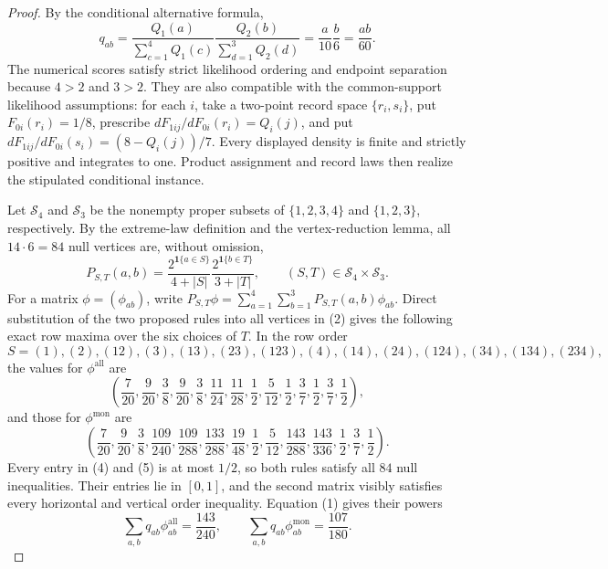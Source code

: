 \documentclass{article}
\begin{document}
\begin{proof}
By the conditional alternative formula,
\[
 q_{ab}=\frac{Q_1(a)}{\sum_{c=1}^4Q_1(c)}
 \frac{Q_2(b)}{\sum_{d=1}^3Q_2(d)}
 =\frac{a}{10}\frac{b}{6}=\frac{ab}{60}. \tag{1}
\]
The numerical scores satisfy strict likelihood ordering and endpoint separation because \(4>2\) and \(3>2\). They are also compatible with the common-support likelihood assumptions: for each \(i\), take a two-point record space \(\{r_i,s_i\}\), put \(F_{0i}(r_i)=1/8\), prescribe \(dF_{1ij}/dF_{0i}(r_i)=Q_i(j)\), and put \(dF_{1ij}/dF_{0i}(s_i)=(8-Q_i(j))/7\). Every displayed density is finite and strictly positive and integrates to one. Product assignment and record laws then realize the stipulated conditional instance.

Let \(\mathcal S_4\) and \(\mathcal S_3\) be the nonempty proper subsets of \(\{1,2,3,4\}\) and \(\{1,2,3\}\), respectively. By the extreme-law definition and the vertex-reduction lemma, all \(14\cdot6=84\) null vertices are, without omission,
\[
 P_{S,T}(a,b)=
 \frac{2^{\mathbf1\{a\in S\}}}{4+|S|}
 \frac{2^{\mathbf1\{b\in T\}}}{3+|T|},
 \qquad (S,T)\in\mathcal S_4\times\mathcal S_3. \tag{2}
\]
For a matrix \(\phi=(\phi_{ab})\), write \(P_{S,T}\phi=\sum_{a=1}^4\sum_{b=1}^3P_{S,T}(a,b)\phi_{ab}\). Direct substitution of the two proposed rules into all vertices in (2) gives the following exact row maxima over the six choices of \(T\). In the row order
\[
 S=(1),(2),(12),(3),(13),(23),(123),(4),(14),(24),(124),(34),(134),(234), \tag{3}
\]
the values for \(\phi^{\mathrm{all}}\) are
\[
 \left(\frac7{20},\frac9{20},\frac38,\frac9{20},\frac38,
 \frac{11}{24},\frac{11}{28},\frac12,\frac5{12},\frac12,
 \frac37,\frac12,\frac37,\frac12\right), \tag{4}
\]
and those for \(\phi^{\mathrm{mon}}\) are
\[
 \left(\frac7{20},\frac9{20},\frac38,\frac{109}{240},
 \frac{109}{288},\frac{133}{288},\frac{19}{48},\frac12,
 \frac5{12},\frac{143}{288},\frac{143}{336},\frac12,
 \frac37,\frac12\right). \tag{5}
\]
Every entry in (4) and (5) is at most \(1/2\), so both rules satisfy all \(84\) null inequalities. Their entries lie in \([0,1]\), and the second matrix visibly satisfies every horizontal and vertical order inequality. Equation (1) gives their powers
\[
 \sum_{a,b}q_{ab}\phi^{\mathrm{all}}_{ab}=\frac{143}{240},
 \qquad
 \sum_{a,b}q_{ab}\phi^{\mathrm{mon}}_{ab}=\frac{107}{180}. \tag{6}
\]


\end{proof}
\end{document}

